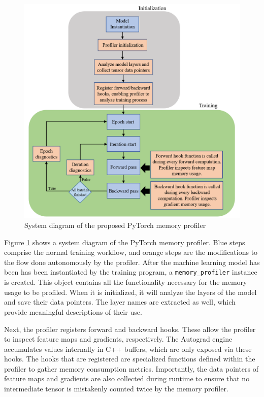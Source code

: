 \documentclass[12pt,letterpaper]{article}
\begin{document}
\begin{figure}[ht]
\centering
\includegraphics[width=1.0\textwidth]{profiler_system_diagram.PNG}
\captionsetup{width=0.9\linewidth}
\caption{System diagram of the proposed PyTorch memory profiler}
\label{fig:profiler_system_diagram}
\end{figure}

Figure \ref{fig:profiler_system_diagram} shows a system diagram of the PyTorch memory profiler. Blue steps comprise the normal training workflow, and orange steps are the modifications to the flow done autonomously by the profiler. After the machine learning model has been has been instantiated by the training program, a \texttt{memory\_profiler} instance is created. This object contains all the functionality necessary for the memory usage to be profiled. When it is initialized, it will analyze the layers of the model and save their data pointers. The layer names are extracted as well, which provide meaningful descriptions of their use. \par 

Next, the profiler registers forward and backward hooks. These allow the profiler to inspect feature maps and gradients, respectively. The Autograd engine accumulates values internally in C++ buffers, which are only exposed via these hooks. The hooks that are registered are specialized functions defined within the profiler to gather memory consumption metrics. Importantly, the data pointers of feature maps and gradients are also collected during runtime to ensure that no intermediate tensor is mistakenly counted twice by the memory profiler. \par 
\end{document}

